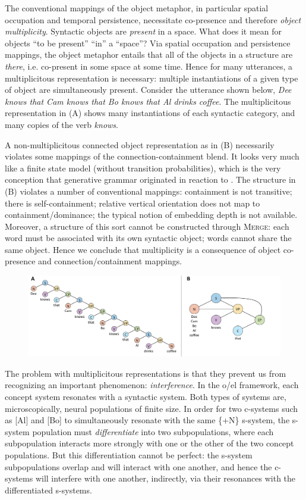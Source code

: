 The conventional mappings of the object metaphor, in particular spatial occupation and temporal persistence, necessitate co-presence and therefore \textit{object multiplicity}. Syntactic objects are \textit{present} in a space. What does it mean for objects “to be present” “in” a “space”? Via spatial occupation and persistence mappings, the object metaphor entails that all of the objects in a structure are \textit{there}, i.e. co-present in some space at some time. Hence for many utterances, a multiplicitous representation is necessary: multiple instantiations of a given type of object are simultaneously present. Consider the utterance shown below, \textit{Dee knows that Cam knows that Bo knows that Al drinks coffee}. The multiplicitous representation in (A) shows many instantiations of each syntactic category, and many copies of the verb \textit{knows}.

  A non-multiplicitous connected object representation as in (B) necessarily violates some mappings of the connection-containment blend. It looks very much like a finite state model (without transition probabilities), which is the very conception that generative grammar originated in reaction to \citep{Chomsky1956}. The structure in (B) violates a number of conventional mappings: containment is not transitive; there is self-containment; relative vertical orientation does not map to containment/dominance; the typical notion of embedding depth is not available. Moreover, a structure of this sort cannot be constructed through \textsc{Merge}: each word must be associated with its own syntactic object; words cannot share the same object. Hence we conclude that multiplicity is a consequence of object co-presence and connection/containment mappings.

  
\begin{figure}
\includegraphics[width=\textwidth]{figures/Tilsen-img36.png}
\caption{\missingcaption}
\label{fig:3:8}
\end{figure}
 

  The problem with multiplicitous representations is that they prevent us from recognizing an important phenomenon: \textit{interference}. In the o/el framework, each concept system resonates with a syntactic system. Both types of systems are, microscopically, neural populations of finite size. In order for two c-systems such as [Al] and [Bo] to simultaneously resonate with the same \{+N\} s-system, the s-system population must \textit{differentiate} into two subpopulations, where each subpopulation interacts more strongly with one or the other of the two concept populations. But this differentiation cannot be perfect: the s-system subpopulations overlap and will interact with one another, and hence the c-systems will interfere with one another, indirectly, via their resonances with the differentiated s-systems. 

